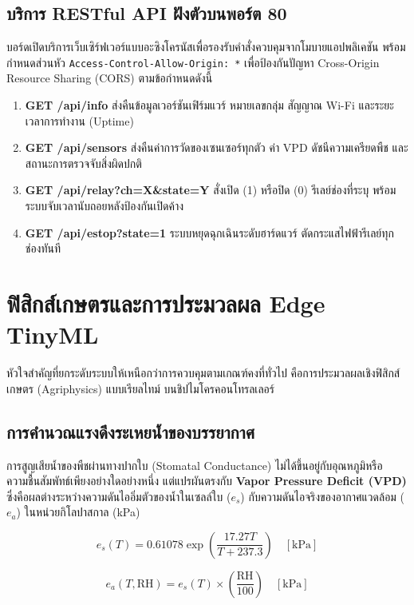 \subsection{บริการ RESTful API ฝังตัวบนพอร์ต 80}
บอร์ดเปิดบริการเว็บเซิร์ฟเวอร์แบบอะซิงโครนัสเพื่อรองรับคำสั่งควบคุมจากโมบายแอปพลิเคชัน พร้อมกำหนดส่วนหัว \texttt{Access-Control-Allow-Origin: *} เพื่อป้องกันปัญหา Cross-Origin Resource Sharing (CORS) ตามข้อกำหนดดังนี้
\begin{enumerate}
    \item \textbf{GET /api/info}  ส่งคืนข้อมูลเวอร์ชันเฟิร์มแวร์ หมายเลขกลุ่ม สัญญาณ Wi-Fi และระยะเวลาการทำงาน (Uptime)
    \item \textbf{GET /api/sensors}  ส่งคืนค่าการวัดของเซนเซอร์ทุกตัว ค่า VPD ดัชนีความเครียดพืช และสถานะการตรวจจับสิ่งผิดปกติ
    \item \textbf{GET /api/relay?ch=X\&state=Y}  สั่งเปิด (1) หรือปิด (0) รีเลย์ช่องที่ระบุ พร้อมระบบจับเวลานับถอยหลังป้องกันเปิดค้าง
    \item \textbf{GET /api/estop?state=1}  ระบบหยุดฉุกเฉินระดับฮาร์ดแวร์ ตัดกระแสไฟฟ้ารีเลย์ทุกช่องทันที
\end{enumerate}

\section{ฟิสิกส์เกษตรและการประมวลผล Edge TinyML}

หัวใจสำคัญที่ยกระดับระบบให้เหนือกว่าการควบคุมตามเกณฑ์คงที่ทั่วไป คือการประมวลผลเชิงฟิสิกส์เกษตร (Agriphysics) แบบเรียลไทม์ บนชิปไมโครคอนโทรลเลอร์

\subsection{การคำนวณแรงดึงระเหยน้ำของบรรยากาศ}
การสูญเสียน้ำของพืชผ่านทางปากใบ (Stomatal Conductance) ไม่ได้ขึ้นอยู่กับอุณหภูมิหรือความชื้นสัมพัทธ์เพียงอย่างใดอย่างหนึ่ง แต่แปรผันตรงกับ \textbf{Vapor Pressure Deficit (VPD)} ซึ่งคือผลต่างระหว่างความดันไออิ่มตัวของน้ำในเซลล์ใบ ($e_s$) กับความดันไอจริงของอากาศแวดล้อม ($e_a$) ในหน่วยกิโลปาสกาล (kPa)

\begin{equation}
e_s(T) = 0.61078 \exp\left( \frac{17.27 T}{T + 237.3} \right) \quad [\text{kPa}]
\end{equation}

\begin{equation}
e_a(T, \text{RH}) = e_s(T) \times \left( \frac{\text{RH}}{100} \right) \quad [\text{kPa}]
\end{equation}

